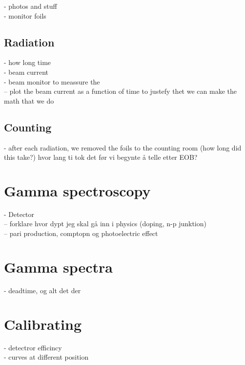 \documentclass[twoside,english]{uiofysmaster/uiofysmaster}
\begin{document}
- photos and stuff\\
- monitor foils



\subsection{Radiation}
\label{sec:radiation}

- how long time\\
- beam current\\
- beam monitor to meassure the  \\
-- plot the beam current  as a function of time to justefy thet we can make the math that we do


\subsection{Counting}
\label{sec:counting}

- after each radiation, we removed the foils to the counting room (how long did this take?) hvor lang ti tok det før vi begynte å telle etter EOB?

\section{Gamma spectroscopy}
\label{sec: gamma_spectro}

- Detector\\
-- forklare hvor dypt jeg skal gå inn i physics (doping, n-p junktion)\\
-- pari production, comptopn og photoelectric effect


\section{Gamma spectra}
\label{sec: gamma_spectra}

- deadtime, og alt det der

\section{Calibrating}
\label{sec: calibrating}

- detectror efficincy\\
- curves at different position


\end{document}
